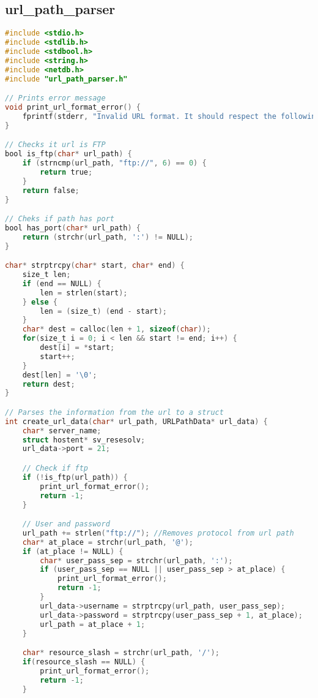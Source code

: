 \subsection{url\_path\_parser}

\begin{lstlisting}[language=C, caption=url\_path\_parser.c]
#include <stdio.h>
#include <stdlib.h>
#include <stdbool.h>
#include <string.h>
#include <netdb.h>
#include "url_path_parser.h"

// Prints error message
void print_url_format_error() {
    fprintf(stderr, "Invalid URL format. It should respect the following convention: ftp://<user>:<password>@<host>:<port>/<url-path>\n");
}

// Checks it url is FTP
bool is_ftp(char* url_path) {
    if (strncmp(url_path, "ftp://", 6) == 0) {
        return true;
    }
    return false;
}

// Cheks if path has port
bool has_port(char* url_path) { 
    return (strchr(url_path, ':') != NULL);
}

char* strptrcpy(char* start, char* end) {
    size_t len;
    if (end == NULL) {
        len = strlen(start);
    } else {
        len = (size_t) (end - start);
    }
    char* dest = calloc(len + 1, sizeof(char));
    for(size_t i = 0; i < len && start != end; i++) {
        dest[i] = *start;
        start++;
    }
    dest[len] = '\0';
    return dest; 
}

// Parses the information from the url to a struct
int create_url_data(char* url_path, URLPathData* url_data) {
    char* server_name;
    struct hostent* sv_resesolv;
    url_data->port = 21;

    // Check if ftp
    if (!is_ftp(url_path)) {
        print_url_format_error();
        return -1;
    }

    // User and password
    url_path += strlen("ftp://"); //Removes protocol from url path
    char* at_place = strchr(url_path, '@');
    if (at_place != NULL) {
        char* user_pass_sep = strchr(url_path, ':');
        if (user_pass_sep == NULL || user_pass_sep > at_place) {
            print_url_format_error();
            return -1;
        }
        url_data->username = strptrcpy(url_path, user_pass_sep);
        url_data->password = strptrcpy(user_pass_sep + 1, at_place);
        url_path = at_place + 1;
    }

    char* resource_slash = strchr(url_path, '/');
    if(resource_slash == NULL) {
        print_url_format_error();
        return -1;
    }


\end{lstlisting}
